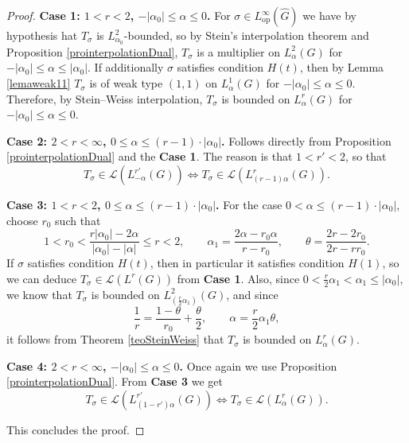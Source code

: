 \documentclass[12pt, reqno]{amsart}
\newcommand{\1}{\mathds{1}}
\begin{document}
\begin{proof}

\quad 


\textbf{Case 1: $1<r<2$, $- |\alpha_0| \leq \alpha \leq 0$.}  For $\sigma \in
L^\infty_{\mathrm{op}}(\widehat{G})$ we have by hypothesis hat $T_\sigma$ is $L^2_{\alpha_0}$-bounded, so by Stein’s interpolation theorem and Proposition \ref{prointerpolationDual}, 
$T_\sigma$ is a multiplier on $L^2_\alpha(G)$ for $-|\alpha_0|\leq \alpha \leq |\alpha_0|$. If additionally $\sigma$ satisfies condition $H(t)$, then
by Lemma \ref{lemaweak11} $T_\sigma$ is of weak type $(1,1)$ on $L^1_\alpha(G)$ for $-|\alpha_0| \leq  \alpha \leq 0$. Therefore, by Stein–Weiss interpolation, $T_\sigma$ is bounded on $L^r_\alpha(G)$ for $-|\alpha_0| \leq  \alpha \leq 0$. 


\textbf{Case 2: $2<r<\infty$, $0 \leq \alpha \leq (r-1) \cdot|\alpha_0|$.} Follows directly from Proposition \ref{prointerpolationDual} and the \textbf{Case 1}. The reason is that $1<r'<2$, so that $$T_\sigma \in \mathcal{L}(L^{r'}_{-\alpha}(G)) \iff T_\sigma \in \mathcal{L}(L^{r}_{(r-1)\alpha}(G)).$$

\textbf{Case 3: $1<r<2$, $0 \leq \alpha \leq (r-1) \cdot  |\alpha_0|$.} For the case $0 < \alpha \leq (r-1) \cdot |\alpha_0|$, choose $r_0$ such that 
\[
1 < r_0 < \frac{r|\alpha_0| - 2\alpha}{|\alpha_0| - |\alpha|} \leq r <2, \qquad 
\alpha_1 = \frac{2\alpha - r_0\alpha}{r-r_0} , \qquad 
\theta = \frac{2r - 2r_0}{2r - rr_0}.
\]If $\sigma$ satisfies condition $H(t)$, then in particular it satisfies condition $H(1)$, so we can deduce $T_\sigma \in \mathcal{L}(L^r (G))$ from \textbf{Case 1}. Also, since $0 <\frac{r}{2} \alpha_1< \alpha_1 \leq |\alpha_0|$, we know that $T_\sigma$ is bounded on $L^2_{( \frac{r}{2} \alpha_1)}(G)$, and since 
\[
\frac{1}{r} = \frac{1-\theta}{r_0} + \frac{\theta}{2}, \qquad 
\alpha = \frac{ r }{2}\alpha_1\theta,
\]
it follows from Theorem \ref{teoSteinWeiss} that $T_\sigma$ is bounded on $L^r_\alpha(G)$.

\textbf{Case 4: $2<r<\infty$, $-|\alpha_0| \leq \alpha \leq 0$.} Once again we use Proposition \ref{prointerpolationDual}. From \textbf{Case 3} we get $$T_\sigma \in \mathcal{L}(L^{r'}_{(1-r') \alpha }(G)) \iff T_\sigma \in \mathcal{L}(L^{r}_{ \alpha }(G)).$$ 

This concludes the proof. 
\end{proof}
\end{document}
